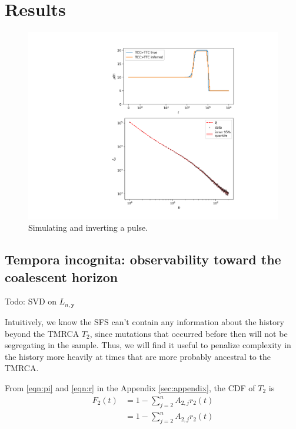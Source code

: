 \documentclass[11pt]{article}
\begin{document}
\section*{Results}\label{sec:results}


\begin{figure}
  \centering
  \includegraphics[width=.7\textwidth]{figures/fit_teaser}
  \caption{Simulating and inverting a pulse.}
  \label{}
\end{figure}

\subsection*{Tempora incognita: observability toward the coalescent horizon}\label{sec:model:loss}

Todo: SVD on $L_{n, \boldsymbol y}$

Intuitively, we know the SFS can't contain any information about the history beyond the TMRCA $T_2$, since mutations that occurred before then will not be segregating in the sample.
Thus, we will find it useful to penalize complexity in the history more heavily at times that are more probably ancestral to the TMRCA.

From \eqref{eqn:pi} and \eqref{eqn:r} in the Appendix \ref{sec:appendix}, the CDF of $T_2$ is
\begin{align}
F_2(t) &= 1 - \sum_{j=2}^n A_{2,j}r_2(t)\\
&= 1 - \sum_{j=2}^n A_{2,j}r_2(t)
\end{align}
\end{document}
